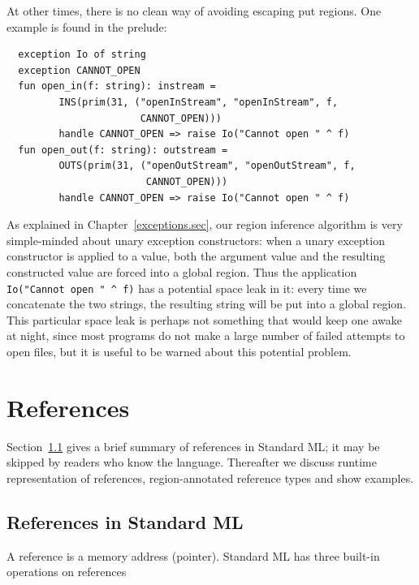 \documentclass[12pt]{book}
\begin{document}
At other times, there is no clean way of avoiding escaping put regions.
One example is found in the prelude:
\begin{verbatim}
  exception Io of string
  exception CANNOT_OPEN
  fun open_in(f: string): instream =         
         INS(prim(31, ("openInStream", "openInStream", f, 
                       CANNOT_OPEN)))
         handle CANNOT_OPEN => raise Io("Cannot open " ^ f)
  fun open_out(f: string): outstream =       
         OUTS(prim(31, ("openOutStream", "openOutStream", f, 
                        CANNOT_OPEN)))
         handle CANNOT_OPEN => raise Io("Cannot open " ^ f)
\end{verbatim}
As explained in Chapter~\ref{exceptions.sec}, 
our region inference algorithm is very simple-minded about 
unary exception constructors:
when a unary exception constructor is applied to a value, both the
argument value and the resulting constructed value are forced into
a global region. Thus the application \verb+Io("Cannot open " ^ f)+
has a potential space leak in it: every time we concatenate the two
strings, the resulting string will be put into a global region. This particular
space leak is perhaps not something that would keep one awake at night, since most 
programs do not make a large number of failed attempts to open files, but it
is useful to be warned about this potential problem.

\chapter{References}
\label{refs.sec}
Section~\ref{refbasics.sec} gives a brief summary of references in
Standard ML; it may be skipped by readers who know the language.
Thereafter we discuss runtime representation of references, region-annotated
reference types and show examples.
\section{References in Standard ML}
\label{refbasics.sec}
A reference is a memory address (pointer).
Standard ML has three built-in operations on references 
\medskip

\medskip
\end{document}
